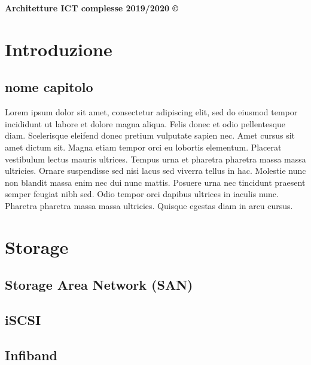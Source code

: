 \documentclass[8pt,a4paper]{article}
\begin{document}
\thispagestyle{empty}
\noindent
  \textbf{Architetture ICT complesse 2019/2020 ©}
\begin{multicols*}{4}
   \section{Introduzione}
   \subsection{nome capitolo}
   Lorem ipsum dolor sit amet, consectetur adipiscing elit, sed do eiusmod tempor incididunt ut labore et dolore magna aliqua. Felis donec et odio pellentesque diam. Scelerisque eleifend donec pretium vulputate sapien nec. Amet cursus sit amet dictum sit. Magna etiam tempor orci eu lobortis elementum. Placerat vestibulum lectus mauris ultrices. Tempus urna et pharetra pharetra massa massa ultricies. Ornare suspendisse sed nisi lacus sed viverra tellus in hac. Molestie nunc non blandit massa enim nec dui nunc mattis. Posuere urna nec tincidunt praesent semper feugiat nibh sed. Odio tempor orci dapibus ultrices in iaculis nunc. Pharetra pharetra massa massa ultricies. Quisque egestas diam in arcu cursus.
\section{Storage}
\subsection{Storage Area Network (SAN)}	
\subsection{iSCSI}	
\subsection{Infiband}	

\end{multicols*}
\end{document}
